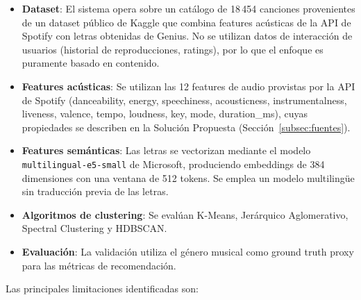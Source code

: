 \begin{itemize}
    \item \textbf{Dataset}: El sistema opera sobre un cat\'{a}logo de 18\,454 canciones provenientes de un dataset p\'{u}blico de Kaggle \parencite{nakhaee_2020_spotify_lyrics} que combina features ac\'{u}sticas de la API de Spotify con letras obtenidas de Genius. No se utilizan datos de interacci\'{o}n de usuarios (historial de reproducciones, ratings), por lo que el enfoque es puramente basado en contenido.

    \item \textbf{Features ac\'{u}sticas}: Se utilizan las 12 features de audio provistas por la API de Spotify (danceability, energy, speechiness, acousticness, instrumentalness, liveness, valence, tempo, loudness, key, mode, duration\_ms), cuyas propiedades se describen en la Soluci\'{o}n Propuesta (Secci\'{o}n~\ref{subsec:fuentes}).

    \item \textbf{Features sem\'{a}nticas}: Las letras se vectorizan mediante el modelo \texttt{multilingual-}\allowbreak\texttt{e5-}\allowbreak\texttt{small} de Microsoft, produciendo embeddings de 384 dimensiones con una ventana de 512 tokens. Se emplea un modelo multiling\"{u}e sin traducci\'{o}n previa de las letras.

    \item \textbf{Algoritmos de clustering}: Se eval\'{u}an K-Means, Jer\'{a}rquico Aglomerativo, Spectral Clustering y HDBSCAN.

    \item \textbf{Evaluaci\'{o}n}: La validaci\'{o}n utiliza el g\'{e}nero musical como ground truth proxy para las m\'{e}tricas de recomendaci\'{o}n.
\end{itemize}

Las principales limitaciones identificadas son:


